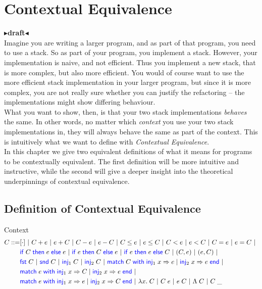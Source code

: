 \documentclass[twoside,11pt,openright]{report}
\theoremstyle{definition}
\newcommand{\BNFdef}{::=}
\newcommand{\ALT}{~|~}
\newcommand{\Keyword}[1]{{\color{blue} \mathsf{#1}}}
\newcommand{\var}{x}
\newcommand{\expr}{e}
\newcommand{\IfCmd}{\Keyword{if}}
\newcommand{\ThenCmd}{\Keyword{then}}
\newcommand{\ElseCmd}{\Keyword{else}}
\def\If#1then#2else#3{\IfCmd{}\;#1\;\ThenCmd{}\;#2\;\ElseCmd{}\;#3}
\newcommand{\Fst}{\Keyword{fst}\;}
\newcommand{\Snd}{\Keyword{snd}\;}
\newcommand{\Inj}[1]{\Keyword{inj}_{#1}\;}
\newcommand{\MatchCmd}{\Keyword{match}}
\newcommand{\WithCmd}{\Keyword{with}}
\newcommand{\EndCmd}{\Keyword{end}}
\def\Match#1with#2=>#3|#4=>#5end{\MatchCmd{}\;#1\;\WithCmd{}\;#2\Rightarrow#3 \;|\;#4\Rightarrow#5\;\EndCmd{}}
\newcommand{\Tlam}{\Lambda\;}
\newcommand{\Tapp}[1]{#1\;\_}
\newcommand{\empctx}{[\cdot]}
\newcommand{\ctx}{C}
\newcommand{\todo}[1]{{\color[rgb]{.5,0,0}\textbf{$\blacktriangleright$#1$\blacktriangleleft$}}}
\begin{document}

\chapter{Contextual Equivalence}
\label{ch:CE}

\todo{draft}\\
Imagine you are writing a larger program, and as part of that program, you need to use a stack. So as part of your program, you implement a stack. However, your implementation is naive, and not efficient. Thus you implement a new stack, that is more complex, but also more efficient. You would of course want to use the more efficient stack implementation in your larger program, but since it is more complex, you are not really sure whether you can justify the refactoring – the implementations might show differing behaviour.\\
What you want to show, then, is that your two stack implementations \textit{behaves} the same. In other words, no matter which \textit{context} you use your two stack implementations in, they will always behave the same as part of the context. This is intuitively what we want to define with \textit{Contextual Equivalence}.\\
In this chapter we give two equivalent definitions of what it means for programs to be contextually equivalent. The first definition will be more intuitive and instructive, while the second will give a deeper insight into the theoretical underpinnings of contextual equivalence.

\section{Definition of Contextual Equivalence}
Context
\begin{align*}
  \ctx \BNFdef& \empctx \ALT
                \ctx + \expr \ALT \expr + \ctx \ALT
                \ctx - \expr \ALT \expr - \ctx \ALT
                \ctx \le \expr \ALT \expr \le \ctx \ALT
                \ctx < \expr \ALT \expr < \ctx \ALT
                \ctx = \expr \ALT \expr = \ctx \ALT\\
              & {\If \ctx then \expr else \expr} \ALT
                {\If \expr then \ctx else \expr} \ALT
                {\If \expr then \expr else \ctx} \ALT
                (\ctx, \expr) \ALT (\expr, \ctx) \ALT\\
              & \Fst \ctx \ALT \Snd \ctx \ALT
                \Inj{1} \ctx \ALT \Inj{2} \ctx \ALT
                \Match \ctx with \Inj{1} \var => \expr | \Inj{2} \var => \expr end \ALT\\
              & \Match \expr with \Inj{1} \var => \ctx | \Inj{2} \var => \expr end \ALT\\
              & \Match \expr with \Inj{1} \var => \expr | \Inj{2} \var => \ctx end \ALT
              \fun \var . \ctx \ALT
              \ctx \; \expr \ALT \expr \; \ctx \ALT \Tlam \ctx \ALT \Tapp{\ctx}
\end{align*}
\end{document}
